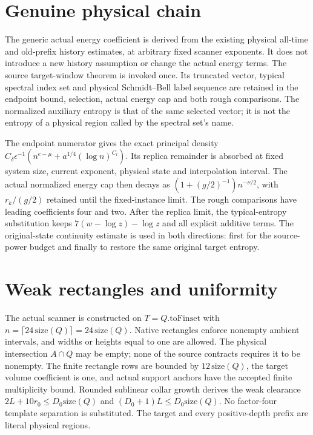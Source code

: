 \documentclass{article}
\begin{document}
\section{Genuine physical chain}
The generic actual energy coefficient is derived from the existing
physical all-time and old-prefix history estimates, at arbitrary fixed
scanner exponents.  It does not introduce a new history assumption or
change the actual energy terms.
The source target-window theorem is invoked once.
Its truncated vector, typical spectral index set and physical
Schmidt--Bell label sequence are retained in the endpoint bound,
selection, actual energy cap and both rough comparisons.
The normalized auxiliary entropy is that of the same selected vector;
it is not the entropy of a physical region called by the spectral set's
name.

The endpoint numerator gives the exact principal density
$C_\delta\epsilon^{-1}(n^{e-\mu}+a^{1/4}(\log n)^{C_l})$.
Its replica remainder is absorbed at fixed system size, current exponent,
physical state and interpolation interval.
The actual normalized energy cap then decays as
$(1+(g/2)^{-1})n^{-\nu/2}$, with $r_k/(g/2)$ retained until the
fixed-instance limit.
The rough comparisons have leading coefficients four and two.
After the replica limit, the typical-entropy substitution keeps
$7(w-\log z)-\log z$ and all explicit additive terms.
The original-state continuity estimate is used in both directions:
first for the source-power budget and finally to restore the same
original target entropy.

\section{Weak rectangles and uniformity}
The actual scanner is constructed on $T=Q.\mathrm{toFinset}$ with
$n=\lceil24\,\mathrm{size}(Q)\rceil=24\,\mathrm{size}(Q)$.
Native rectangles enforce nonempty ambient intervals, and widths or
heights equal to one are allowed.  The physical intersection $A\cap Q$
may be empty; none of the source contracts requires it to be nonempty.
The finite rectangle rows are bounded by $12\,\mathrm{size}(Q)$,
the target volume coefficient is one, and actual support anchors have
the accepted finite multiplicity bound.
Rounded sublinear collar growth derives the weak clearance
$2L+10r_0\leq D_0\mathrm{size}(Q)$ and
$(D_0+1)L\leq D_0\mathrm{size}(Q)$.
No factor-four template separation is substituted.
The target and every positive-depth prefix are literal physical regions.
\end{document}
